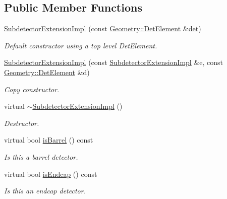 \subsection*{Public Member Functions}
\begin{DoxyCompactItemize}
\item 
\hyperlink{class_d_d4hep_1_1_d_d_rec_1_1_subdetector_extension_impl_aa87c1c247120d64f47319b314c1e9981}{SubdetectorExtensionImpl} (const \hyperlink{class_d_d4hep_1_1_geometry_1_1_det_element}{Geometry::DetElement} \&\hyperlink{class_d_d4hep_1_1_d_d_rec_1_1_subdetector_extension_impl_a5573895361adac8070eb23454538d76e}{det})
\begin{DoxyCompactList}\small\item\em Default constructor using a top level DetElement. \item\end{DoxyCompactList}\item 
\hyperlink{class_d_d4hep_1_1_d_d_rec_1_1_subdetector_extension_impl_a9443068ab7f0f9c8da31798bac46fab7}{SubdetectorExtensionImpl} (const \hyperlink{class_d_d4hep_1_1_d_d_rec_1_1_subdetector_extension_impl}{SubdetectorExtensionImpl} \&e, const \hyperlink{class_d_d4hep_1_1_geometry_1_1_det_element}{Geometry::DetElement} \&d)
\begin{DoxyCompactList}\small\item\em Copy constructor. \item\end{DoxyCompactList}\item 
virtual \hyperlink{class_d_d4hep_1_1_d_d_rec_1_1_subdetector_extension_impl_afd3a7134db3e0d40b6fc9cdbb809f147}{$\sim$SubdetectorExtensionImpl} ()
\begin{DoxyCompactList}\small\item\em Destructor. \item\end{DoxyCompactList}\item 
virtual bool \hyperlink{class_d_d4hep_1_1_d_d_rec_1_1_subdetector_extension_impl_a3a024678317cb6cf0f0794c041b70b96}{isBarrel} () const 
\begin{DoxyCompactList}\small\item\em Is this a barrel detector. \item\end{DoxyCompactList}\item 
virtual bool \hyperlink{class_d_d4hep_1_1_d_d_rec_1_1_subdetector_extension_impl_a2f282d14ec8c7f72fe996722df3fb66f}{isEndcap} () const 
\begin{DoxyCompactList}\small\item\em Is this an endcap detector. \item\end{DoxyCompactList}\item 

\end{DoxyCompactItemize}
